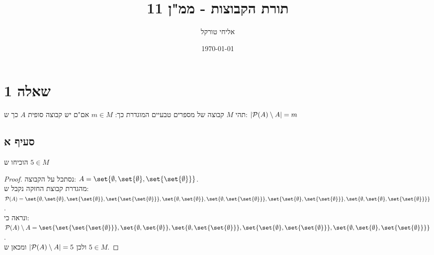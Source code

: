 \documentclass{article}
\title{תורת הקבוצות - ממ"ן 11}
\author{אליחי טורקל \ID}
\date\today
\DeclarePairedDelimiter\set\{\}
\begin{document}
	\maketitle %


	\section*{שאלה 1}
	תהי $M$ קבוצה של מספרים טבעיים המוגדרת כך:
	$m \in M$ אם"ם יש קבוצה סופית $A$ כך ש: $\left| \mathcal{P}(A) \setminus A \right| = m$

	\subsection*{סעיף א}
	הוכיחו ש $5 \in M$
	\begin{proof}
		נסתכל על הקבוצה: $A = \set{\emptyset, \set{\emptyset}, \set{\set{\emptyset}}}$. \\
		מהגדרת קבוצת החזקה נקבל ש: \\
		$\PP(A) = \set{\emptyset, \set{\emptyset}, \set{\set{\emptyset}}, \set{\set{\set{\emptyset}}}, \set{\emptyset, \set{\emptyset}}, \set{\emptyset, \set{\set{\emptyset}}}, \set{\set{\emptyset}, \set{\set{\emptyset}}}, \set{\emptyset, \set{\emptyset}, \set{\set{\emptyset}}}}$. \\
		ונראה כי: $\PP(A) \sub A = \set{\set{\set{\set{\emptyset}}}, \set{\emptyset, \set{\emptyset}}, \set{\emptyset, \set{\set{\emptyset}}}, \set{\set{\emptyset}, \set{\set{\emptyset}}}, \set{\emptyset, \set{\emptyset}, \set{\set{\emptyset}}}}$. \\
		ולכן $\left| \mathcal{P}(A) \setminus A \right| = 5$ ומכאן ש $5 \in M$.
	\end{proof}
\end{document}
